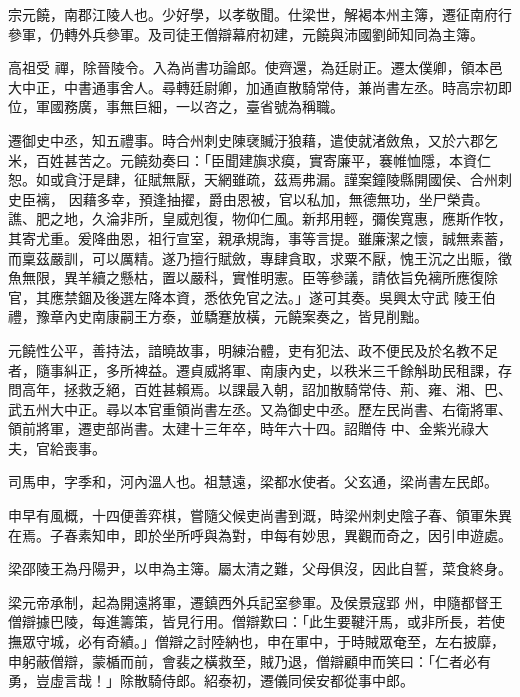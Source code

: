 
\begin{pinyinscope}

 宗元饒，南郡江陵人也。少好學，以孝敬聞。仕梁世，解褐本州主簿，遷征南府行參軍，仍轉外兵參軍。及司徒王僧辯幕府初建，元饒與沛國劉師知同為主簿。



 高祖受
 禪，除晉陵令。入為尚書功論郎。使齊還，為廷尉正。遷太僕卿，領本邑大中正，中書通事舍人。尋轉廷尉卿，加通直散騎常侍，兼尚書左丞。時高宗初即位，軍國務廣，事無巨細，一以咨之，臺省號為稱職。



 遷御史中丞，知五禮事。時合州刺史陳裦贓汙狼藉，遣使就渚斂魚，又於六郡乞米，百姓甚苦之。元饒劾奏曰：「臣聞建旟求瘼，實寄廉平，褰帷恤隱，本資仁恕。如或貪汙是肆，征賦無厭，天網雖疏，茲焉弗漏。謹案鐘陵縣開國侯、合州刺史臣褵，
 因藉多幸，預逢抽擢，爵由恩被，官以私加，無德無功，坐尸榮貴。譙、肥之地，久淪非所，皇威剋復，物仰仁風。新邦用輕，彌俟寬惠，應斯作牧，其寄尤重。爰降曲恩，祖行宣室，親承規誨，事等言提。雖廉潔之懷，誠無素蓄，而稟茲嚴訓，可以厲精。遂乃擅行賦斂，專肆貪取，求粟不厭，愧王沉之出賑，徵魚無限，異羊續之懸枯，置以嚴科，實惟明憲。臣等參議，請依旨免褵所應復除官，其應禁錮及後選左降本資，悉依免官之法。」遂可其奏。吳興太守武
 陵王伯禮，豫章內史南康嗣王方泰，並驕蹇放橫，元饒案奏之，皆見削黜。



 元饒性公平，善持法，諳曉故事，明練治體，吏有犯法、政不便民及於名教不足者，隨事糾正，多所裨益。遷貞威將軍、南康內史，以秩米三千餘斛助民租課，存問高年，拯救乏絕，百姓甚賴焉。以課最入朝，詔加散騎常侍、荊、雍、湘、巴、武五州大中正。尋以本官重領尚書左丞。又為御史中丞。歷左民尚書、右衛將軍、領前將軍，遷吏部尚書。太建十三年卒，時年六十四。詔贈侍
 中、金紫光祿大夫，官給喪事。



 司馬申，字季和，河內溫人也。祖慧遠，梁都水使者。父玄通，梁尚書左民郎。



 申早有風概，十四便善弈棋，嘗隨父候吏尚書到溉，時梁州刺史陰子春、領軍朱異在焉。子春素知申，即於坐所呼與為對，申每有妙思，異觀而奇之，因引申遊處。



 梁邵陵王為丹陽尹，以申為主簿。屬太清之難，父母俱沒，因此自誓，菜食終身。



 梁元帝承制，起為開遠將軍，遷鎮西外兵記室參軍。及侯景寇郢
 州，申隨都督王僧辯據巴陵，每進籌策，皆見行用。僧辯歎曰：「此生要鞬汗馬，或非所長，若使撫眾守城，必有奇績。」僧辯之討陸納也，申在軍中，于時賊眾奄至，左右披靡，申躬蔽僧辯，蒙楯而前，會裴之橫救至，賊乃退，僧辯顧申而笑曰：「仁者必有勇，豈虛言哉！」除散騎侍郎。紹泰初，遷儀同侯安都從事中郎。




\end{pinyinscope}
